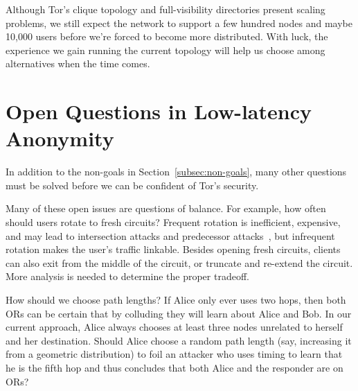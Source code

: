 \documentclass[twocolumn]{article}
\begin{document}
Although Tor's clique topology and full-visibility directories present
scaling problems, we still expect the network to support a few hundred
nodes and maybe 10,000 users before we're forced to become
more distributed. With luck, the experience we gain running the current
topology will help us choose among alternatives when the time comes.

\section{Open Questions in Low-latency Anonymity}
\label{sec:maintaining-anonymity}

In addition to the non-goals in
Section~\ref{subsec:non-goals}, many other questions must be solved
before we can be confident of Tor's security.

Many of these open issues are questions of balance. For example,
how often should users rotate to fresh circuits? Frequent rotation
is inefficient, expensive, and may lead to intersection attacks and
predecessor attacks~\cite{wright03}, but infrequent rotation makes the
user's traffic linkable. Besides opening fresh circuits, clients can
also exit from the middle of the circuit,
or truncate and re-extend the circuit. More analysis is
needed to determine the proper tradeoff.

%

How should we choose path lengths? If Alice only ever uses two hops,
then both ORs can be certain that by colluding they will learn about
Alice and Bob. In our current approach, Alice always chooses at least
three nodes unrelated to herself and her destination.
%
Should Alice choose a random path length (say,
increasing it from a geometric distribution) to foil an attacker who
uses timing to learn that he is the fifth hop and thus concludes that
both Alice and the responder are on ORs?
\end{document}
